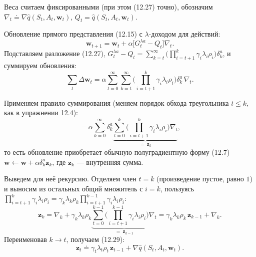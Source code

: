 \begin{solution}
    Веса считаем фиксированными (при этом (12.27) точно), обозначим
    $\nabla_t \doteq \nabla\hat q(S_t,A_t,\mathbf w_t)$, $Q_t=\hat q(S_t,A_t,\mathbf w_t)$.

    Обновление прямого представления (12.15) с $\lambda$-доходом для действий:
    \begin{equation*}
        \mathbf w_{t+1} = \mathbf w_t + \alpha\big[G_t^{\lambda a} - Q_t\big]\nabla_t.
    \end{equation*}
    Подставляем разложение (12.27), $G_t^{\lambda a}-Q_t=\sum_{k=t}^{\infty}
    \big(\prod_{i=t+1}^{k}\gamma_i\lambda_i\rho_i\big)\delta_k^a$, и суммируем
    обновления:
    \begin{equation*}
        \sum_{t}\Delta\mathbf w_t
        = \alpha\sum_{t=0}^{\infty}\sum_{k=t}^{\infty}
          \Big(\prod_{i=t+1}^{k}\gamma_i\lambda_i\rho_i\Big)\delta_k^a\,\nabla_t.
    \end{equation*}

    Применяем правило суммирования (меняем порядок обхода треугольника $t\le k$,
    как в упражнении 12.4):
    \begin{equation*}
        = \alpha\sum_{k=0}^{\infty}\delta_k^a
          \underbrace{\sum_{t=0}^{k}\Big(\prod_{i=t+1}^{k}\gamma_i\lambda_i\rho_i\Big)\nabla_t}_{\displaystyle \doteq\ \mathbf z_k},
    \end{equation*}
    то есть обновление приобретает обычную полуградиентную форму (12.7)
    $\mathbf w \leftarrow \mathbf w + \alpha\delta_k^a\mathbf z_k$, где $\mathbf z_k$ ---
    внутренняя сумма.

    Выведем для неё рекурсию. Отделяем член $t=k$ (произведение пустое, равно $1$) и
    выносим из остальных общий множитель с $i=k$, пользуясь
    $\prod_{i=t+1}^{k}\gamma_i\lambda_i\rho_i = \gamma_k\lambda_k\rho_k\prod_{i=t+1}^{k-1}\gamma_i\lambda_i\rho_i$:
    \begin{equation*}
        \mathbf z_k = \nabla_k + \gamma_k\lambda_k\rho_k
        \underbrace{\sum_{t=0}^{k-1}\Big(\prod_{i=t+1}^{k-1}\gamma_i\lambda_i\rho_i\Big)\nabla_t}_{=\ \mathbf z_{k-1}}
        = \gamma_k\lambda_k\rho_k\,\mathbf z_{k-1} + \nabla_k.
    \end{equation*}
    Переименовав $k\to t$, получаем (12.29):
    \begin{equation*}
        \mathbf z_t \doteq \gamma_t\lambda_t\rho_t\,\mathbf z_{t-1} + \nabla\hat q(S_t,A_t,\mathbf w_t).
    \end{equation*}
\end{solution}

